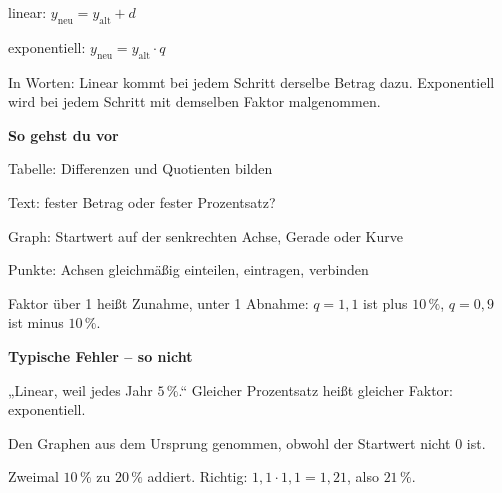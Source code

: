 \documentclass[11pt]{article}
\newcommand{\nr}[1]{\makebox[7mm][l]{\textbf{#1}}}
\newlength{\kr}
\begin{document}
\begin{tcolorbox}[colback=mbkasten,colframe=mbgrau,boxrule=0.5pt,arc=1mm,left=3mm,right=3mm,top=2mm,bottom=2mm,title={\bfseries Formel auf einen Blick},coltitle=black,colbacktitle=black!10]
\begin{minipage}[t]{0.58\linewidth}\vspace{0pt}
{\Large linear: \quad $y_{\text{neu}} = y_{\text{alt}} + d$ \par exponentiell: \quad $y_{\text{neu}} = y_{\text{alt}} \cdot q$}\par\medskip
In Worten: Linear kommt bei jedem Schritt derselbe Betrag dazu. Exponentiell wird bei jedem Schritt mit demselben Faktor malgenommen.\par\medskip
\textbf{So gehst du vor}\par
\nr{1}Tabelle: Differenzen und Quotienten bilden\par
\nr{2}Text: fester Betrag oder fester Prozentsatz?\par
\nr{3}Graph: Startwert auf der senkrechten Achse, Gerade oder Kurve\par
\nr{4}Punkte: Achsen gleichmäßig einteilen, eintragen, verbinden\par
\medskip
{\small Faktor über 1 heißt Zunahme, unter 1 Abnahme: $q = 1{,}1$ ist plus $10\,\%$, $q = 0{,}9$ ist minus $10\,\%$.}
\end{minipage}\hfill
\begin{minipage}[t]{0.38\linewidth}\vspace{2mm}\centering
{}
\end{minipage}
\end{tcolorbox}
\medskip\noindent\textbf{Typische Fehler – so nicht}\par\smallskip
\noindent\nr{$\times$}„Linear, weil jedes Jahr $5\,\%$.“ Gleicher Prozentsatz heißt gleicher Faktor: exponentiell.\par
\noindent\nr{$\times$}Den Graphen aus dem Ursprung genommen, obwohl der Startwert nicht $0$ ist.\par
\noindent\nr{$\times$}Zweimal $10\,\%$ zu $20\,\%$ addiert. Richtig: $1{,}1 \cdot 1{,}1 = 1{,}21$, also $21\,\%$.\par
\end{document}
